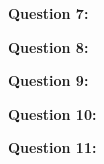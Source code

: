 \documentclass{report}
\begin{document}
    \bigbreak \noindent \bigbreak \noindent 
    \begin{Large}
        \textbf{Question 7:}
    \end{Large}
    \bigbreak \noindent 
    \bigbreak \noindent 


    \bigbreak \noindent \bigbreak \noindent 
    \begin{Large}
        \textbf{Question 8:}
    \end{Large}
    \bigbreak \noindent 
    \bigbreak \noindent 


    \bigbreak \noindent \bigbreak \noindent 
    \begin{Large}
        \textbf{Question 9:}
    \end{Large}
    \bigbreak \noindent 
    \bigbreak \noindent 


    \bigbreak \noindent \bigbreak \noindent 
    \begin{Large}
        \textbf{Question 10:}
    \end{Large}
    \bigbreak \noindent 
    \bigbreak \noindent 


    \bigbreak \noindent \bigbreak \noindent 
    \begin{Large}
        \textbf{Question 11:}
    \end{Large}
    \bigbreak \noindent 
    \bigbreak \noindent 
\end{document}
